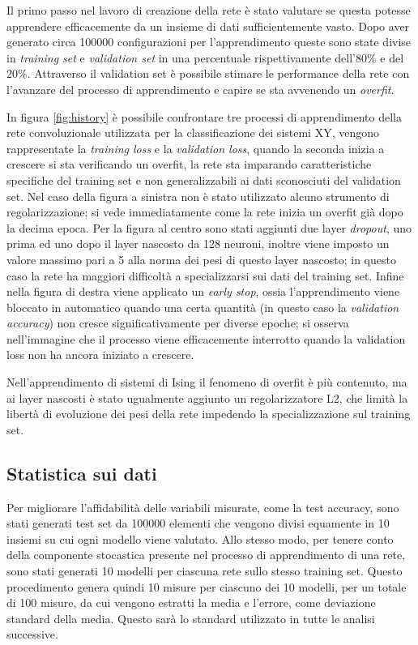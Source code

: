 \documentclass{article}
\begin{document}
Il primo passo nel lavoro di creazione della rete è stato valutare se questa potesse apprendere efficacemente da un insieme di dati sufficientemente vasto.
Dopo aver generato circa \num{100000} configurazioni per l'apprendimento queste sono state divise in \emph{training set} e \emph{validation set} in una percentuale rispettivamente dell'$80\%$ e del $20\%$.
Attraverso il validation set è possibile stimare le performance della rete con l'avanzare del processo di apprendimento e capire se sta avvenendo un \emph{overfit}.

In figura \ref{fig:history} è possibile confrontare tre processi di apprendimento della rete convoluzionale utilizzata per la classificazione dei sistemi XY, vengono rappresentate la \emph{training loss} e la \emph{validation loss}, quando la seconda inizia a crescere si sta verificando un overfit, la rete sta imparando caratteristiche specifiche del training set e non generalizzabili ai dati sconosciuti del validation set.
Nel caso della figura a sinistra non è stato utilizzato alcuno strumento di regolarizzazione; si vede immediatamente come la rete inizia un overfit già dopo la decima epoca.
Per la figura al centro sono stati aggiunti due layer \emph{dropout}, uno prima ed uno dopo il layer nascosto da 128 neuroni, inoltre viene imposto un valore massimo pari a 5 alla norma dei pesi di questo layer nascosto; in questo caso la rete ha maggiori difficoltà a specializzarsi sui dati del training set.
Infine nella figura di destra viene applicato un \emph{early stop}, ossia l'apprendimento viene bloccato in automatico quando una certa quantità (in questo caso la \emph{validation accuracy}) non cresce significativamente per diverse epoche; si osserva nell'immagine che il processo viene efficacemente interrotto quando la validation loss non ha ancora iniziato a crescere.

Nell'apprendimento di sistemi di Ising il fenomeno di overfit è più contenuto, ma ai layer nascosti è stato ugualmente aggiunto un regolarizzatore L2, che limità la libertà di evoluzione dei pesi della rete impedendo la specializzazione sul training set.

\subsection{Statistica sui dati} \label{sec:stats}
Per migliorare l'affidabilità delle variabili misurate, come la test accuracy, sono stati generati test set da \num{100000} elementi che vengono divisi equamente in 10 insiemi su cui ogni modello viene valutato.
Allo stesso modo, per tenere conto della componente stocastica presente nel processo di apprendimento di una rete, sono stati generati 10 modelli per ciascuna rete sullo stesso training set.
Questo procedimento genera quindi 10 misure per ciascuno dei 10 modelli, per un totale di 100 misure, da cui vengono estratti la media e l'errore, come deviazione standard della media.
Questo sarà lo standard utilizzato in tutte le analisi successive.
\end{document}
